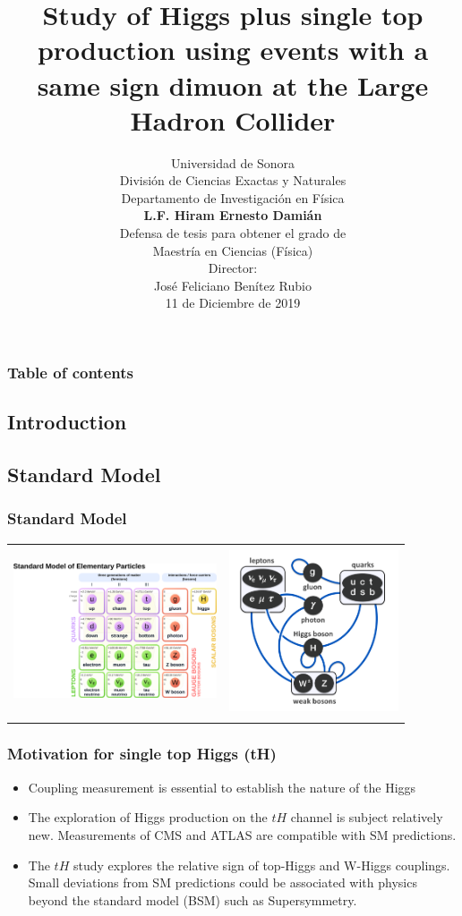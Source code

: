 \documentclass[11pt]{beamer}
\author{\scriptsize
 	Universidad de Sonora\\
 	\vspace{1px}
 	Divisi\'on de Ciencias Exactas y Naturales\\
 	\vspace{1px}
 	Departamento de Investigaci\'on en F\'isica\\
 	   \vspace{5px}
   \textbf{L.F. Hiram Ernesto Dami\'an}\\
   Defensa de tesis para obtener el grado de \\
      Maestr\'ia en Ciencias (F\'isica)\\
         \vspace{5px}
   Director:\\
   \vspace{1px}
   Jos\'e Feliciano Ben\'itez Rubio\\
\vspace{5px}
11 de Diciembre de 2019}
\title{Study of Higgs plus single top production using events with a same sign dimuon  at the Large Hadron Collider}
\date{}
\begin{document}
\begin{frame}
\titlepage
\end{frame}

\begin{frame}
	\frametitle{Table of contents}
\tiny
\tableofcontents
\end{frame}


\begin{frame}
\section{Introduction}
\subsection{Standard Model}
\frametitle{Standard Model}
\begin{table}
	\centering
\begin{tabular}{cc}
\includegraphics[width=6cm,height=5cm]{figures/sm1.png} & \includegraphics[width=5cm,height=5cm]{figures/sm.png}
\end{tabular}
\end{table}
\end{frame}

\begin{frame}
\frametitle{Motivation  for single top Higgs (tH)}
\begin{itemize}
\item Coupling measurement is essential to establish the nature of the Higgs
\item The exploration of Higgs production on the $tH$ channel is subject relatively new. Measurements of CMS and ATLAS are compatible with SM predictions.
\item The $tH$ study explores the relative sign of top-Higgs  and W-Higgs couplings.\\ Small deviations from SM predictions could be associated with physics beyond the
standard model (BSM) such as Supersymmetry.
\end{itemize}
\end{frame}
\end{document}
